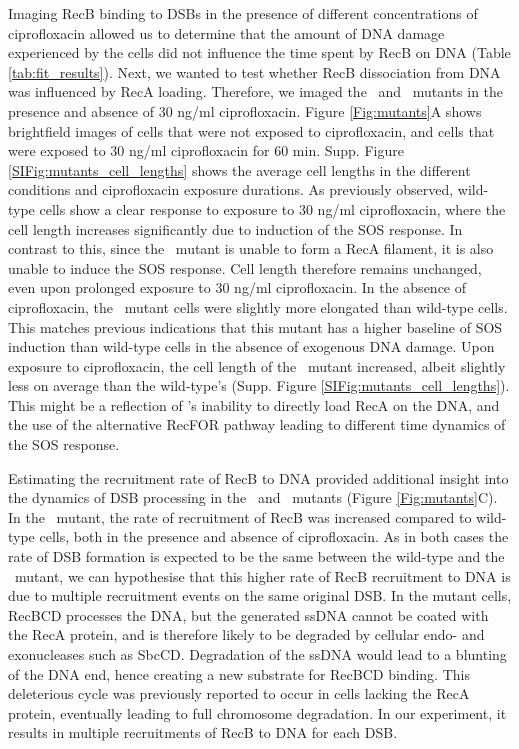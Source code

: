 Imaging RecB binding to DSBs in the presence of different concentrations of ciprofloxacin allowed us to determine that the amount of DNA damage experienced by the cells did not influence the time spent by RecB on DNA (Table \ref{tab:fit_results}). Next, we wanted to test whether RecB dissociation from DNA was influenced by RecA loading. Therefore, we imaged the \dreca\ and \teneighty\ mutants in the presence and absence of 30 ng/ml ciprofloxacin. Figure \ref{Fig:mutants}A shows brightfield images of cells that were not exposed to ciprofloxacin, and cells that were exposed to 30 ng/ml ciprofloxacin for 60 min. Supp. Figure \ref{SIFig:mutants_cell_lengths} shows the average cell lengths in the different conditions and ciprofloxacin exposure durations. As previously observed, wild-type cells show a clear response to exposure to 30 ng/ml ciprofloxacin, where the cell length increases significantly due to induction of the SOS response. In contrast to this, since the \dreca\ mutant is unable to form a RecA filament, it is also unable to induce the SOS response. Cell length therefore remains unchanged, even upon prolonged exposure to 30 ng/ml ciprofloxacin. In the absence of ciprofloxacin, the \teneighty\ mutant cells were slightly more elongated than wild-type cells. This matches previous indications that this mutant has a higher baseline of SOS induction than wild-type cells in the absence of exogenous DNA damage\cite{Lepore2023}. Upon exposure to ciprofloxacin, the cell length of the \teneighty\ mutant increased, albeit slightly less on average than the wild-type's (Supp. Figure \ref{SIFig:mutants_cell_lengths}). This might be a reflection of \teneighty's inability to directly load RecA on the DNA, and the use of the alternative RecFOR pathway leading to different time dynamics of the SOS response\cite{Ivancic-Bace_2003,Lepore2023}.

Estimating the recruitment rate of RecB to DNA provided additional insight into the dynamics of DSB processing in the \dreca\ and \teneighty\ mutants (Figure \ref{Fig:mutants}C). In the \dreca\ mutant, the rate of recruitment of RecB was increased compared to wild-type cells, both in the presence and absence of ciprofloxacin. As in both cases the rate of DSB formation is expected to be the same between the wild-type and the \dreca\ mutant, we can hypothesise that this higher rate of RecB recruitment to DNA is due to multiple recruitment events on the same original DSB. In the mutant cells, RecBCD processes the DNA, but the generated ssDNA cannot be coated with the RecA protein, and is therefore likely to be degraded by cellular endo- and exonucleases such as SbcCD. Degradation of the ssDNA would lead to a blunting of the DNA end, hence creating a new substrate for RecBCD binding. This deleterious cycle was previously reported to occur in cells lacking the RecA protein, eventually leading to full chromosome degradation\cite{Capaldo1975,Skarstad1993}. In our experiment, it results in multiple recruitments of RecB to DNA for each DSB.

